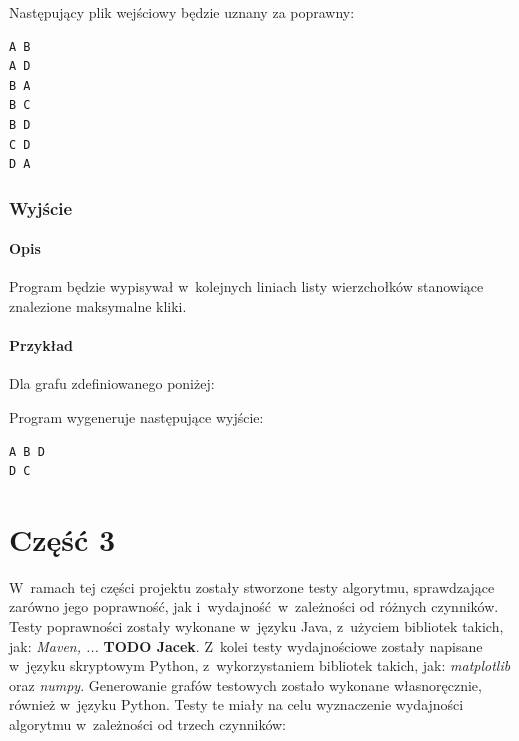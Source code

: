 \documentclass[11pt,a4paper]{article}
\begin{document}
\noindent Następujący plik wejściowy będzie uznany za poprawny:\\
\begin{lstlisting}[caption = Przykładowy plik wejściowy]
A B
A D
B A
B C
B D
C D
D A
\end{lstlisting}

\subsubsection{Wyjście}
\paragraph{Opis} Program będzie wypisywał w~kolejnych liniach listy wierzchołków stanowiące znalezione maksymalne kliki.
\paragraph{Przykład} Dla grafu zdefiniowanego poniżej:\\


\noindent Program wygeneruje następujące wyjście:\\
\begin{lstlisting}[caption = Wynik działania programu]
A B D
D C
\end{lstlisting}

\section{Część 3}
W~ramach tej części projektu zostały stworzone testy algorytmu, sprawdzające zarówno jego poprawność, jak i~wydajność w~zależności od różnych czynników. Testy poprawności zostały wykonane w~języku Java, z~użyciem bibliotek takich, jak: \textit{Maven, ...} \textbf{TODO Jacek}. Z~kolei testy wydajnościowe zostały napisane w~języku skryptowym Python, z~wykorzystaniem bibliotek takich, jak: \textit{matplotlib} oraz \textit{numpy}. Generowanie grafów testowych zostało wykonane własnoręcznie, również w~języku Python. Testy te miały na celu wyznaczenie wydajności algorytmu w~zależności od trzech czynników:
\end{document}
